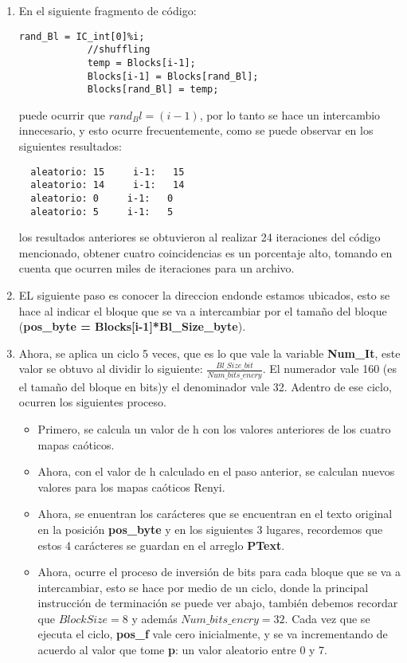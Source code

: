 \documentclass[10pt]{IEEEtran}
\begin{document}
\begin{enumerate}
\item En el siguiente fragmento de código:
\begin{verbatim}
rand_Bl = IC_int[0]%i;
			//shuffling 
			temp = Blocks[i-1];
			Blocks[i-1] = Blocks[rand_Bl];
			Blocks[rand_Bl] = temp;
\end{verbatim}

puede ocurrir que $rand_Bl= (i-1)$, por lo tanto se hace un intercambio innecesario, y esto ocurre frecuentemente, como se puede observar en los siguientes resultados:

\begin{verbatim}
  aleatorio: 15     i-1:   15
  aleatorio: 14     i-1:   14
  aleatorio: 0     i-1:   0
  aleatorio: 5     i-1:   5
\end{verbatim}

los resultados anteriores se obtuvieron al realizar 24 iteraciones del código mencionado, obtener cuatro coincidencias es un porcentaje alto, tomando en cuenta que ocurren miles de iteraciones para un archivo.



\item EL siguiente paso es conocer la direccion endonde estamos ubicados, esto se hace al indicar el bloque que se va a intercambiar por el tamaño del bloque (\textbf{pos\_byte = Blocks[i-1]*Bl\_Size\_byte}).

\item Ahora, se aplica un ciclo 5 veces, que es lo que vale la variable \textbf{Num\_It}, este valor se obtuvo al dividir lo siguiente: $ \frac{Bl\_Size\_bit}{Num\_bits\_encry}$. El numerador vale 160 (es el tamaño del bloque en bits)y el denominador vale 32. Adentro de ese ciclo, ocurren los siguientes proceso.
\begin{itemize}
\item Primero, se calcula un valor de h con los valores anteriores de los cuatro mapas caóticos.
\item Ahora, con el valor de h calculado en el paso anterior, se calculan nuevos valores para los mapas caóticos Renyi. 

\item Ahora, se enuentran los carácteres que se encuentran en el texto original en la posición \textbf{pos\_byte} y en los siguientes 3 lugares, recordemos que estos 4 carácteres se guardan en el arreglo \textbf{PText}.

\item Ahora, ocurre el proceso de inversión de bits para cada bloque que se va a intercambiar, esto se hace por medio de un ciclo, donde la principal instrucción de terminación se puede ver abajo, también debemos recordar que  $BlockSize= 8$ y además $Num\_bits\_encry =32$. Cada vez que se ejecuta el ciclo, \textbf{pos\_f} vale cero inicialmente, y se va incrementando de acuerdo al valor que tome \textbf{p}: un valor aleatorio entre 0 y 7.


\end{itemize}
\end{enumerate}
\end{document}
